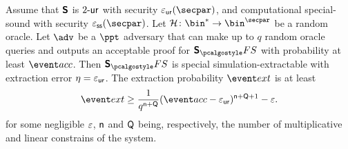\documentclass[runningheads,11pt]{llncs}
\begin{document}
\begin{corollary}
  \label{thm:sonicprotfs_se}
  Assume that $\bm{\mathsf{S}}$ is ${2\text{-}\mathsf{ur}}$ with security $\epsur(\secpar)$, and
  computational special-sound with security $\epsss(\secpar)$. Let $\ro\colon
  \bin^* \to \bin^\secpar$ be a random oracle. Let $\advse$ be a $\ppt$
  adversary that can make up to $q$ random oracle queries and outputs an
  acceptable proof for $\sonicprotfs$ with probability at least $\accProb$. Then
  $\sonicprotfs$ is special simulation-extractable with extraction error $\eta =
  \varepsilon_{\mathsf{ur}}$. The extraction probability $\extProb$ is at least
\[
		\extProb  \geq \frac{1}{q^{\multconstr + \linconstr}} (\accProb - \epsur)^{\multconstr +
		\linconstr + 1} - \eps.
	\]
	for some negligible $\varepsilon$, $\mathsf{n}$ and $\mathsf{Q}$ being,
  respectively, the number of multiplicative and linear constrains of the system.
\end{corollary}


\end{document}
